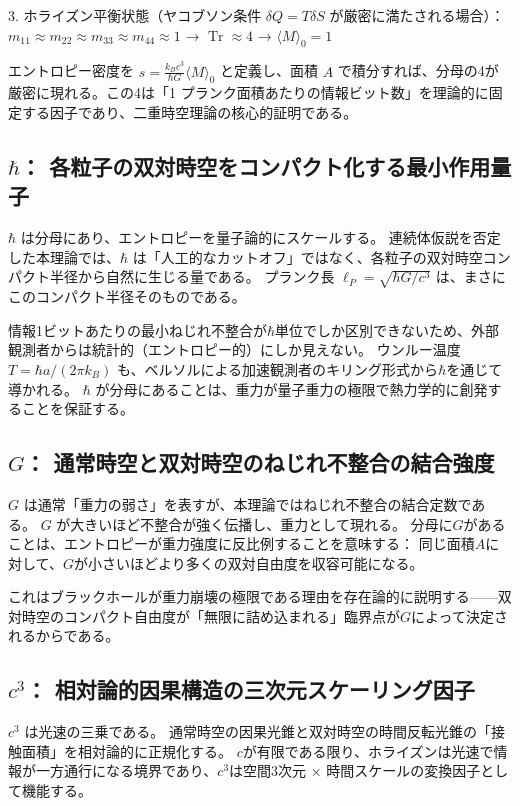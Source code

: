 \documentclass[dvipdfmx,a4paper]{jsbook}
\theoremstyle{definition}
\theoremstyle{remark}
\begin{document}
3. ホライズン平衡状態（ヤコブソン条件 $\delta Q = T \delta S$ が厳密に満たされる場合）：$m_{11} \approx m_{22} \approx m_{33} \approx m_{44} \approx 1$ → $\operatorname{Tr} \approx 4$ → $\langle M \rangle_0 = 1$

エントロピー密度を $s = \frac{k_B c^3}{\hbar G} \langle M \rangle_0$ と定義し、面積 $A$ で積分すれば、分母の4が厳密に現れる。この4は「1 プランク面積あたりの情報ビット数」を理論的に固定する因子であり、二重時空理論の核心的証明である。

\subsection{$\hbar$： 各粒子の双対時空をコンパクト化する最小作用量子}

$\hbar$ は分母にあり、エントロピーを量子論的にスケールする。
連続体仮説を否定した本理論では、$\hbar$ は「人工的なカットオフ」ではなく、各粒子の双対時空コンパクト半径から自然に生じる量である。
プランク長 $\ell_P = \sqrt{\hbar G / c^3}$ は、まさにこのコンパクト半径そのものである。

情報1ビットあたりの最小ねじれ不整合が$\hbar$単位でしか区別できないため、外部観測者からは統計的（エントロピー的）にしか見えない。
ウンルー温度 $T = \hbar a / (2\pi k_B)$ も、ベルソルによる加速観測者のキリング形式から$\hbar$を通じて導かれる。  
$\hbar$ が分母にあることは、重力が量子重力の極限で熱力学的に創発することを保証する。

\subsection{$G$： 通常時空と双対時空のねじれ不整合の結合強度}

$G$ は通常「重力の弱さ」を表すが、本理論ではねじれ不整合の結合定数である。
$G$ が大きいほど不整合が強く伝播し、重力として現れる。
分母に$G$があることは、エントロピーが重力強度に反比例することを意味する：
同じ面積$A$に対して、$G$が小さいほどより多くの双対自由度を収容可能になる。

これはブラックホールが重力崩壊の極限である理由を存在論的に説明する——双対時空のコンパクト自由度が「無限に詰め込まれる」臨界点が$G$によって決定されるからである。

\subsection{$c^3$： 相対論的因果構造の三次元スケーリング因子}

$c^3$ は光速の三乗である。
通常時空の因果光錐と双対時空の時間反転光錐の「接触面積」を相対論的に正規化する。
$c$が有限である限り、ホライズンは光速で情報が一方通行になる境界であり、$c^3$は空間3次元 × 時間スケールの変換因子として機能する。
\end{document}
